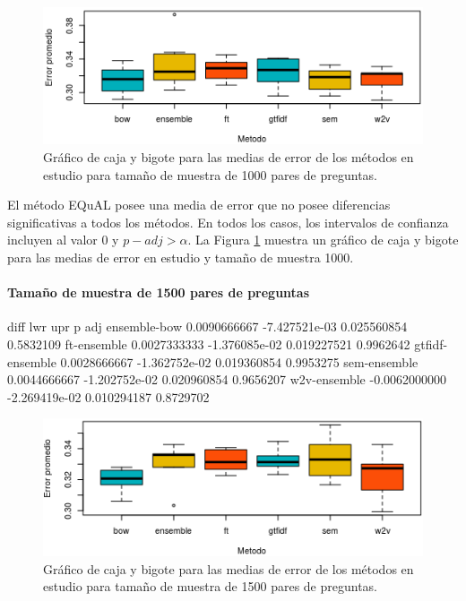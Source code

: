 \begin{figure}
	\centering
	\includegraphics[width=0.7\linewidth]{10_resultados/imagenes/anova_1000}
	\caption{Gráfico de caja y bigote para las medias de error de los métodos en estudio para tamaño de muestra de 1000 pares de preguntas.}
	\label{fig:anova1000}
\end{figure}

\bigskip El método EQuAL posee una media de error que no posee diferencias significativas a todos los métodos. En todos los casos, los intervalos de confianza incluyen al valor 0 y \(p{-}adj > \alpha\). La Figura \ref{fig:anova1000} muestra un gráfico de caja y bigote para las medias de error en estudio y tamaño de muestra 1000.

\bigskip
\paragraph{Tamaño de muestra de 1500 pares de preguntas}
\begin{rc}
                        diff           lwr         upr     p adj
ensemble-bow     0.0090666667 -7.427521e-03 0.025560854 0.5832109
ft-ensemble      0.0027333333 -1.376085e-02 0.019227521 0.9962642
gtfidf-ensemble  0.0028666667 -1.362752e-02 0.019360854 0.9953275
sem-ensemble     0.0044666667 -1.202752e-02 0.020960854 0.9656207
w2v-ensemble    -0.0062000000 -2.269419e-02 0.010294187 0.8729702
\end{rc}

\begin{figure}
	\centering
	\includegraphics[width=0.7\linewidth]{10_resultados/imagenes/anova_1500}
	\caption{Gráfico de caja y bigote para las medias de error de los métodos en estudio para tamaño de muestra de 1500 pares de preguntas.}
	\label{fig:anova1500}
\end{figure}

